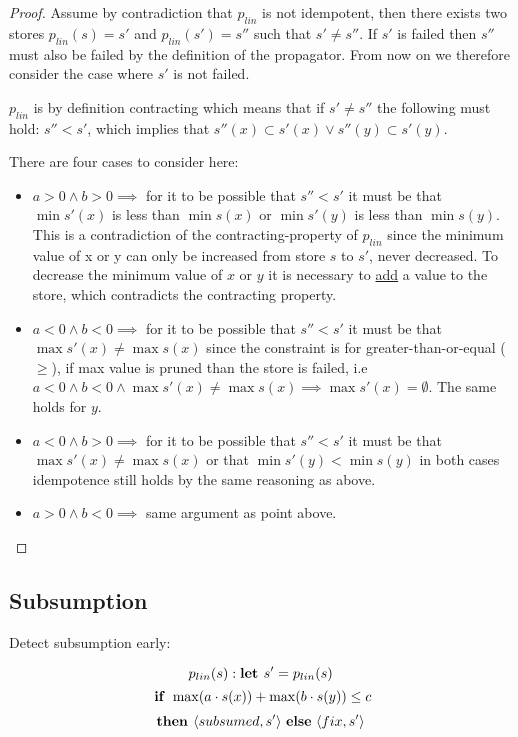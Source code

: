 \documentclass[a4paper, 11pt]{article}
\begin{document}
\begin{proof}
Assume by contradiction that $p_{lin}$ is not idempotent, then there exists two stores $p_{lin}(s) = s'$ and $p_{lin}(s') = s''$ such that  $s' \neq s''$. If $s'$ is failed then $s''$ must also be failed by the definition of the propagator. From now on we therefore consider the case where $s'$ is not failed.

$p_{lin}$ is by definition contracting which means that if $s' \neq s''$ the following must hold: $s'' < s'$, which implies that $s''(x) \subset s'(x) \lor s''(y) \subset s'(y)$.

There are four cases to consider here:
\begin{itemize}
\item $a>0 \land b>0 \implies$ for it to be possible that $s'' < s'$ it must be that $\min s'(x)$ is less than $\min s(x)$ or $\min s'(y)$ is less than $\min s(y)$. This is a contradiction of the contracting-property of $p_{lin}$ since the minimum value of x or y can only be increased from store $s$ to $s'$, never decreased. To decrease the minimum value of $x$ or $y$ it is necessary to \underline{add} a value to the store, which contradicts the contracting property.
\item $a < 0 \land b < 0 \implies$ for it to be possible that $s'' < s'$ it must be that $\max s'(x) \neq \max s(x)$ since the constraint is for greater-than-or-equal ($\geq$), if max value is pruned than the store is failed, i.e $a<0 \land b < 0 \land \max s'(x) \neq \max s(x) \implies \max s'(x) = \emptyset$. The same holds for $y$.
\item $a < 0 \land b > 0 \implies$ for it to be possible that $s'' < s'$ it must be that $\max s'(x) \neq \max s(x)$ or that $\min s'(y) < \min s(y)$ in both cases idempotence still holds by the same reasoning as above.
\item $a > 0 \land b < 0 \implies$ same argument as point above.
\end{itemize}
\end{proof}
\subsection*{Subsumption}
Detect subsumption early:

$$p_{lin}(s):  \text{\textbf{let }} s' = p_{lin}(s)$$
$$\text{ \textbf{if }} \max(a \cdot s(x)) + \max(b \cdot s(y)) \leq c$$
$$\text{\textbf{then }} \langle subsumed, s' \rangle \text{ \textbf{else} } \langle fix, s' \rangle$$
\end{document}
